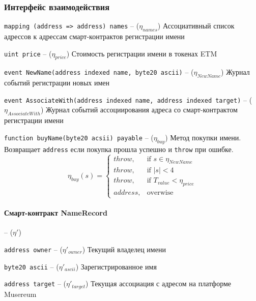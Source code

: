 \documentclass[12pt]{report}
\def\code#1{\colorbox{light-gray}{\texttt{#1}}}
\begin{document}
\subsubsection{Интерфейс взаимодействия}
\label{tech-apps-mns-api}
\code{mapping (address => address) names} – ($\eta_{names}$)\hfill\null\linebreak
Ассоциативный список адрессов к адрессам смарт-контрактов регистрации имени

\code{uint price} – ($\eta_{price}$)\hfill\null\linebreak
Стоимость регистрации имени в токенах ETM

\code{event NewName(address indexed name, byte20 ascii)} – ($\eta_{NewName}$)\hfill\null\linebreak
Журнал событий регистрации новых имен

\code{event AssociateWith(address indexed name, address indexed target)} – ($\eta_{AssociateWith}$)\hfill\null\linebreak
Журнал событий ассоциирования адреса со смарт-контрактом регистрации имени

\code{function buyName(byte20 acsii) payable} – ($\eta_{buy}$)\hfill\null\linebreak
Метод покупки имени. Возвращает \code{address} если покупка прошла успешно и \code{throw} при ошибке.
\begin{equation}
\eta_{buy}(s) = \begin{cases}
	throw, & \text{if } s \in \eta_{NewName} \\ 
	throw, & \text{if } |s| < 4 \\
	throw, & \text{if } T_{value} < \eta_{price} \\
	address, & \text{overwise}
\end{cases}
\end{equation}

\paragraph{Смарт-контракт NameRecord}– ($\eta'$)

\code{address owner} – ($\eta'_{owner}$)\hfill\null\linebreak
Текущий владелец имени

\code{byte20 ascii} – ($\eta'_{ascii}$)\hfill\null\linebreak
Зарегистрированное имя

\code{address target} – ($\eta'_{target}$)\hfill\null\linebreak
Текущая ассоциация с адресом на платформе Musereum
\end{document}
